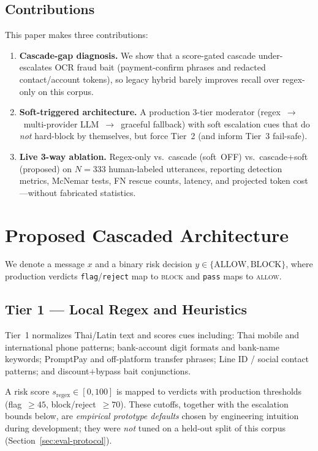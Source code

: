 \documentclass[conference]{IEEEtran}
\begin{document}
\subsection{Contributions}
This paper makes three contributions:
\begin{enumerate}
  \item \textbf{Cascade-gap diagnosis.} We show that a score-gated cascade
        under-escalates OCR fraud bait (payment-confirm phrases and redacted
        contact/account tokens), so legacy hybrid barely improves recall over
        regex-only on this corpus.
  \item \textbf{Soft-triggered architecture.} A production 3-tier moderator
        (regex~$\rightarrow$~multi-provider LLM~$\rightarrow$~graceful fallback)
        with soft escalation cues that do \emph{not} hard-block by themselves,
        but force Tier~2 (and inform Tier~3 fail-safe).
  \item \textbf{Live 3-way ablation.} Regex-only vs.\ cascade (soft~OFF) vs.\
        cascade+soft (proposed) on $N{=}333$ human-labeled utterances, reporting
        detection metrics, McNemar tests, FN rescue counts, latency, and
        projected token cost---without fabricated statistics.
\end{enumerate}

\section{Proposed Cascaded Architecture}

We denote a message $x$ and a binary risk decision
$y\in\{\mathrm{ALLOW},\mathrm{BLOCK}\}$, where production verdicts
\texttt{flag}/\texttt{reject} map to \textsc{block} and \texttt{pass} maps to
\textsc{allow}.

\subsection{Tier 1 --- Local Regex and Heuristics}
Tier~1 normalizes Thai/Latin text and scores cues including: Thai mobile and
international phone patterns; bank-account digit formats and bank-name keywords;
PromptPay and off-platform transfer phrases; Line ID / social contact patterns;
and discount$+$bypass bait conjunctions.

A risk score $s_{\mathrm{regex}}\in[0,100]$ is mapped to verdicts with production
thresholds (flag~$\geq 45$, block/reject~$\geq 70$). These cutoffs, together with
the escalation bounds below, are \emph{empirical prototype defaults} chosen by
engineering intuition during development; they were \emph{not} tuned on a held-out
split of this corpus (Section~\ref{sec:eval-protocol}).
\end{document}
